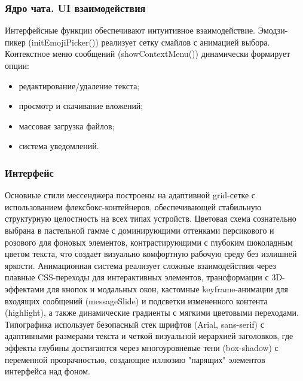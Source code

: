 \subsubsection{Ядро чата. UI взаимодействия}
Интерфейсные функции обеспечивают интуитивное взаимодействие. Эмодзи-пикер (initEmojiPicker()) реализует сетку смайлов с анимацией выбора. Контекстное меню сообщений (showContextMenu()) динамически формирует опции:
\begin{itemize}
	\item редактирование/удаление текста;
	\item просмотр и скачивание вложений;
	\item массовая загрузка файлов;
	\item система уведомлений.
\end{itemize}
\subsubsection{Интерфейс}
Основные стили мессенджера построены на адаптивной grid-сетке с использованием флексбокс-контейнеров, обеспечивающей стабильную структурную целостность на всех типах устройств. Цветовая схема сознательно выбрана в пастельной гамме с доминирующими оттенками персикового и розового для фоновых элементов, контрастирующими с глубоким шоколадным цветом текста, что создает визуально комфортную рабочую среду без излишней яркости. Анимационная система реализует сложные взаимодействия через плавные CSS-переходы для интерактивных элементов, трансформации с 3D-эффектами для кнопок и модальных окон, кастомные keyframe-анимации для входящих сообщений (messageSlide) и подсветки измененного контента (highlight), а также динамические градиенты с мягкими цветовыми переходами. Типографика использует безопасный стек шрифтов (Arial, sans-serif) с адаптивными размерами текста и четкой визуальной иерархией заголовков, где эффекты глубины достигаются через многоуровневые тени (box-shadow) с переменной прозрачностью, создающие иллюзию "парящих" элементов интерфейса над фоном.

